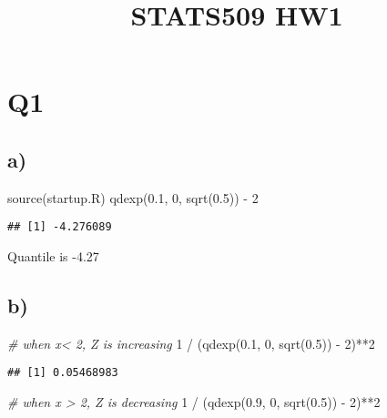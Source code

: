 \documentclass[
]{article}
\title{STATS509 HW1}
\author{}
\date{\vspace{-2.5em}}
\newenvironment{Shaded}{\begin{snugshade}}{\end{snugshade}}
\newcommand{\CommentTok}[1]{\textcolor[rgb]{0.56,0.35,0.01}{\textit{#1}}}
\newcommand{\DecValTok}[1]{\textcolor[rgb]{0.00,0.00,0.81}{#1}}
\newcommand{\FloatTok}[1]{\textcolor[rgb]{0.00,0.00,0.81}{#1}}
\newcommand{\FunctionTok}[1]{\textcolor[rgb]{0.00,0.00,0.00}{#1}}
\newcommand{\NormalTok}[1]{#1}
\newcommand{\SpecialCharTok}[1]{\textcolor[rgb]{0.00,0.00,0.00}{#1}}
\newcommand{\StringTok}[1]{\textcolor[rgb]{0.31,0.60,0.02}{#1}}
\begin{document}
\maketitle

\hypertarget{q1}{%
\section{Q1}\label{q1}}

\hypertarget{a}{%
\subsection{a)}\label{a}}

\begin{Shaded}
\begin{Highlighting}[]
\FunctionTok{source}\NormalTok{(}\StringTok{\textquotesingle{}startup.R\textquotesingle{}}\NormalTok{)}
\FunctionTok{qdexp}\NormalTok{(}\FloatTok{0.1}\NormalTok{, }\DecValTok{0}\NormalTok{, }\FunctionTok{sqrt}\NormalTok{(}\FloatTok{0.5}\NormalTok{)) }\SpecialCharTok{{-}} \DecValTok{2}
\end{Highlighting}
\end{Shaded}

\begin{verbatim}
## [1] -4.276089
\end{verbatim}

Quantile is -4.27

\hypertarget{b}{%
\subsection{b)}\label{b}}

\begin{Shaded}
\begin{Highlighting}[]
\CommentTok{\# when x\textless{} 2, Z is increasing }
\DecValTok{1} \SpecialCharTok{/}\NormalTok{ (}\FunctionTok{qdexp}\NormalTok{(}\FloatTok{0.1}\NormalTok{, }\DecValTok{0}\NormalTok{, }\FunctionTok{sqrt}\NormalTok{(}\FloatTok{0.5}\NormalTok{)) }\SpecialCharTok{{-}} \DecValTok{2}\NormalTok{)}\SpecialCharTok{**}\DecValTok{2}
\end{Highlighting}
\end{Shaded}

\begin{verbatim}
## [1] 0.05468983
\end{verbatim}

\begin{Shaded}
\begin{Highlighting}[]
\CommentTok{\# when x \textgreater{} 2, Z is decreasing}
\DecValTok{1} \SpecialCharTok{/}\NormalTok{ (}\FunctionTok{qdexp}\NormalTok{(}\FloatTok{0.9}\NormalTok{, }\DecValTok{0}\NormalTok{, }\FunctionTok{sqrt}\NormalTok{(}\FloatTok{0.5}\NormalTok{)) }\SpecialCharTok{{-}} \DecValTok{2}\NormalTok{)}\SpecialCharTok{**}\DecValTok{2}
\end{Highlighting}
\end{Shaded}
\end{document}
